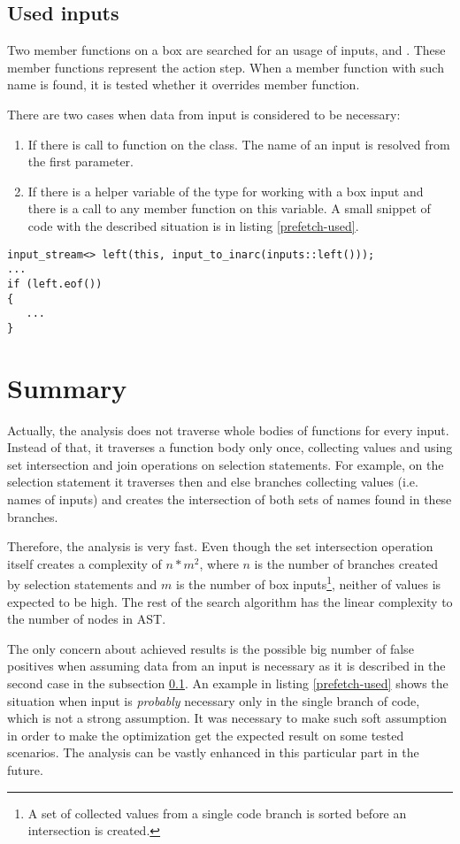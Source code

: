 \subsection{Used inputs}
\label{prefetch-used-inputs}
Two member functions on a box are searched for an usage of inputs,  and . These member functions represent the action step. When a member function with such name is found, it is tested whether it overrides  member function.

There are two cases when data from input is considered to be necessary:

\begin{enumerate}
\item If there is call to  function on the  class. The name of an input is resolved from the first parameter.
\item If there is a helper variable of the type  for working with a box input and there is a call to any member function on this variable. A small snippet of code with the described situation is in listing \ref{prefetch-used}.
\end{enumerate}

\begin{lstlisting}[caption={An example of an \textit{used} input.}, label={prefetch-used}]
input_stream<> left(this, input_to_inarc(inputs::left()));
...
if (left.eof())
{
   ...
}
\end{lstlisting}

\section{Summary}
Actually, the analysis does not traverse whole bodies of functions for every input. Instead of that, it traverses a function body only once, collecting values and using set intersection and join operations on selection statements. For example, on the  selection statement it traverses then and else branches collecting values (i.e. names of inputs) and creates the intersection of both sets of names found in these branches.

Therefore, the analysis is very fast. Even though the set intersection operation itself creates a complexity of $n*m^2$, where $n$ is the number of branches created by selection statements and $m$ is the number of box inputs\footnote{A set of collected values from a single code branch is sorted before an intersection is created.}, neither of values is expected to be high. The rest of the search algorithm has the linear complexity to the number of nodes in AST.

The only concern about achieved results is the possible big number of false positives when assuming data from an input is necessary as it is described in the second case in the subsection \ref{prefetch-used-inputs}. An example in listing \ref{prefetch-used} shows the situation when input is \emph{probably} necessary only in the single branch of code, which is not a strong assumption. It was necessary to make such soft assumption in order to make the optimization get the expected result on some tested scenarios. The analysis can be vastly enhanced in this particular part in the future.